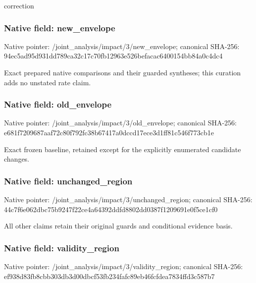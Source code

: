 \documentclass[10pt,a4paper]{article}
\begin{document}
\begingroup\raggedright\sloppy correction\par\endgroup

\subsubsection{Native field: new\_\allowbreak{}envelope}
Native pointer: /joint\_\allowbreak{}analysis/impact/3/new\_\allowbreak{}envelope; canonical SHA-256: 94ec5ad95d931dd789ca32c17c70fb12963e526befacac6400154bb84a0c4dc4

\begingroup\raggedright\sloppy Exact prepared native comparisons and their guarded syntheses;\allowbreak{} this curation adds no unstated rate claim.\par\endgroup

\subsubsection{Native field: old\_\allowbreak{}envelope}
Native pointer: /joint\_\allowbreak{}analysis/impact/3/old\_\allowbreak{}envelope; canonical SHA-256: e681f7209687aaf72c80f792fc38b67417a0dccd17ece3d1ff81c546f773cb1e

\begingroup\raggedright\sloppy Exact frozen baseline,\allowbreak{} retained except for the explicitly enumerated candidate changes.\par\endgroup

\subsubsection{Native field: unchanged\_\allowbreak{}region}
Native pointer: /joint\_\allowbreak{}analysis/impact/3/unchanged\_\allowbreak{}region; canonical SHA-256: 44c7f6e062dbc75b9247f22ce4a64392ddfd8802dd0387f1209691e0f5ce1cf0

\begingroup\raggedright\sloppy All other claims retain their original guards and conditional evidence basis.\par\endgroup

\subsubsection{Native field: validity\_\allowbreak{}region}
Native pointer: /joint\_\allowbreak{}analysis/impact/3/validity\_\allowbreak{}region; canonical SHA-256: ef938d83fb8cbb303db3d00dbcf53fb234fafc89eb46fcfdea7834ffd3c587b7
\end{document}
